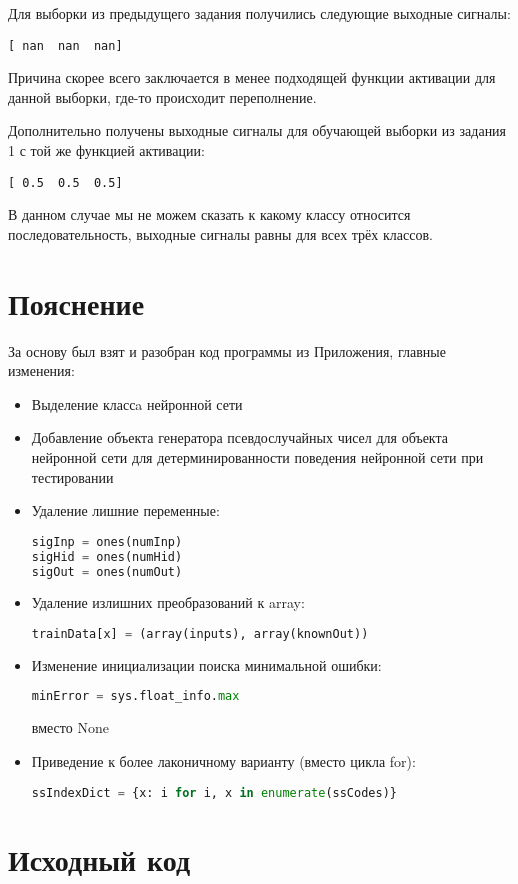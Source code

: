 \documentclass{article} %
\begin{document}
Для выборки из предыдущего задания получились следующие выходные сигналы:
\begin{verbatim}
[ nan  nan  nan]
\end{verbatim}

Причина скорее всего заключается в менее подходящей функции активации для данной выборки, где-то происходит переполнение.

Дополнительно получены выходные сигналы для обучающей выборки из задания 1 с той же функцией активации:
\begin{verbatim}
[ 0.5  0.5  0.5]
\end{verbatim}

В данном случае мы не можем сказать к какому классу относится последовательность, выходные сигналы равны для всех трёх классов.

\section{Пояснение}
За основу был взят и разобран код программы из Приложения, главные изменения:
\begin{itemize}
	\item Выделение классa нейронной сети
	\item Добавление объекта генератора псевдослучайных чисел для объекта нейронной сети для детерминированности поведения нейронной сети при тестировании
	\item Удаление лишние переменные:
		\begin{lstlisting}[language=Python]
sigInp = ones(numInp)
sigHid = ones(numHid)
sigOut = ones(numOut)
		\end{lstlisting}
	\item Удаление излишних преобразований к array:
		\begin{lstlisting}[language=Python]
trainData[x] = (array(inputs), array(knownOut))
		\end{lstlisting}
	\item Изменение инициализации поиска минимальной ошибки:
		\begin{lstlisting}[language=Python]
minError = sys.float_info.max
		\end{lstlisting}
вместо None
	\item Приведение к более лаконичному варианту (вместо цикла for):
		\begin{lstlisting}[language=Python]
ssIndexDict = {x: i for i, x in enumerate(ssCodes)}
		\end{lstlisting}
\end{itemize}

\section{Исходный код}
% 
\end{document}
